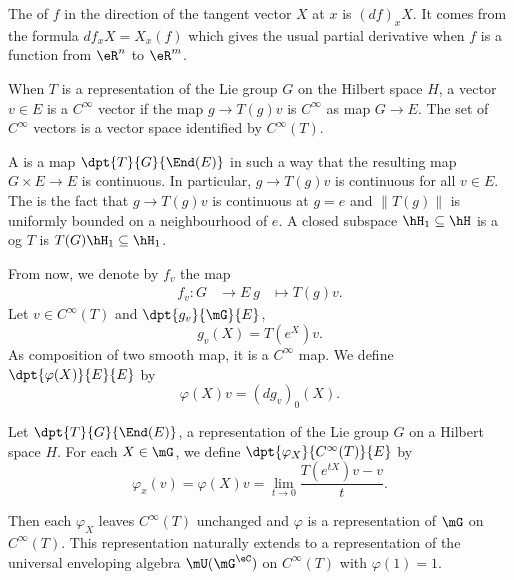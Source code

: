 The  of $f$ in the direction of the tangent vector $X$ at $x$ is $(df)_xX$. It comes from the formula $df_xX=X_x(f)$ which gives the usual partial derivative when $f$ is a function from $\eR^n$ to $\eR^m$.

When $T$ is a representation of the Lie group $G$ on the Hilbert space $H$, a vector $v\in E$ is a $ C^{\infty}$ vector if the map $g\to T(g)v$ is $ C^{\infty}$ as map $G\to E$. The set of $ C^{\infty}$ vectors is a vector space identified by $ C^{\infty}(T)$.

A  is a map $\dpt{ T }{ G }{ \End(E) }$ in such a way that the resulting map $G\times E\to E$ is continuous. In particular, $g\to T(g)v$ is continuous for all $v\in E$. The  is the fact that $g\to T(g)v$ is continuous at $g=e$ and $\| T(g) \|$ is uniformly bounded on a neighbourhood of $e$. A closed subspace $\hH_1\subseteq\hH$ is a  og $T$ is $T(G)\hH_1\subseteq \hH_1$.

From now, we denote by $f_v$ the map
\begin{equation}
	\begin{aligned}
		f_v  \colon G & \to E\
		g             & \mapsto T(g)v.
	\end{aligned}
\end{equation}
Let $v\in C^{\infty}(T)$ and $\dpt{g_v}{\mG}{E}$,
\[
	g_v(X)=T(e^X)v.
\]
As composition of two smooth map, it is a $ C^{\infty}$ map. We define $\dpt{\varphi(X)}{E}{E}$ by
\[
	\varphi(X)v=(dg_v)_0(X).
\]

\begin{proposition}
	Let $\dpt{T}{G}{\End(E)}$, a representation of the Lie group $G$ on a Hilbert space $H$. For each  $X\in\mG$, we define $\dpt{\varphi_X}{C^{\infty}(T)}{E}$ by
	\begin{equation} \label{eq:250105r1}
		\varphi_x(v)=\varphi(X)v=\lim_{t\to 0}\frac{T(e^{tX})v-v}{t}.
	\end{equation}

	Then  each $\varphi_X$ leaves $ C^{\infty}(T)$ unchanged and $\varphi$ is a representation of $\mG$ on $ C^{\infty}(T)$. This representation naturally extends to a representation of the universal enveloping algebra $\mU(\mG^{\eC})$ on $ C^{\infty}(T)$ with $\varphi(1)=1$.

\end{proposition}

